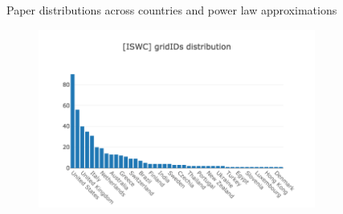 \documentclass{llncs}
\begin{document}
\begin{figure}[t]
\begin{subfigure}{.5\textwidth}
	\caption[ ]{}
	\label{fig:tpdl_dois_longtail}
\end{subfigure}
\caption{Paper distributions across countries and power law approximations}
\label{fig:dois_longtail}
\end{figure}
%
\begin{figure}[h]
\begin{subfigure}{.5\textwidth}
	\centering
    \includegraphics[width=\textwidth]{images/iswc_gridids_longtail.png}
	\caption[ ]{}
	\label{fig:iswc_gridids_longtail}
\end{subfigure}%
\begin{subfigure}{.5\textwidth}
	\centering

\end{subfigure}
\end{figure}
\end{document}
